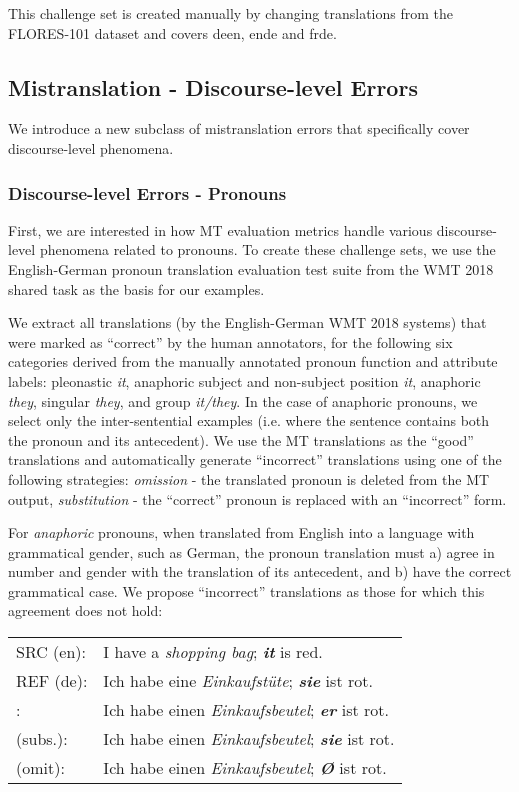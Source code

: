 \documentclass[11pt]{article}
\newcommand{\cmark}{\textcolor{darkpastelgreen}{\ding{51}}}\newcommand{\xmark}{\textcolor{darkpastelred}{\ding{55}}}
\begin{document}
This challenge set is created manually by changing translations from the FLORES-101 dataset and covers deen, ende and frde.


\subsection{Mistranslation - Discourse-level Errors}
\label{sec:discourse}
We introduce a new subclass of mistranslation errors that specifically cover discourse-level phenomena.
\subsubsection{Discourse-level Errors - Pronouns}

First, we are interested in how MT evaluation metrics handle various discourse-level phenomena related to pronouns. To create these challenge sets, we use the English-German pronoun translation evaluation test suite from the WMT 2018 shared task as the basis for our examples.

We extract all translations (by the English-German WMT 2018 systems) that were marked as ``correct'' by the human annotators, for the following six categories derived from the manually annotated pronoun function and attribute labels: pleonastic \textit{it}, anaphoric subject and non-subject position \textit{it}, anaphoric \textit{they}, singular \textit{they}, and group \textit{it/they}. In the case of anaphoric pronouns, we select only the inter-sentential examples (i.e. where the sentence contains both the pronoun and its antecedent). We use the MT translations as the ``good'' translations and automatically generate ``incorrect'' translations using one of the following strategies: \textit{omission} - the translated pronoun is deleted from the MT output, \textit{substitution} - the ``correct'' pronoun is replaced with an ``incorrect'' form.


For \textit{anaphoric} pronouns, when translated from English into a language with grammatical gender, such as German, the pronoun translation must a) agree in number and gender with the translation of its antecedent, and b) have the correct grammatical case. We propose ``incorrect'' translations as those for which this agreement does not hold:

\begin{small}
\vspace{0.5cm}
\setlength{\extrarowheight}{0.1cm}
\begin{tabular}{ll}
     SRC (en): & I have a \textit{shopping bag}; \textbf{\textit{it}} is red.\\
     REF (de): & Ich habe eine \textit{Einkaufstüte}; \textbf{\textit{sie}} ist rot.\\
     \cmark: & Ich habe einen \textit{Einkaufsbeutel}; \textbf{\textit{er}} ist rot.\\
     \xmark{} (subs.): & Ich habe einen \textit{Einkaufsbeutel}; \textbf{\textit{sie}} ist rot.\\
     \xmark{} (omit): & Ich habe einen \textit{Einkaufsbeutel}; \textbf{\textit{\O}} ist rot.
     \vspace{0.35cm}
\end{tabular}
\end{small}
\end{document}

